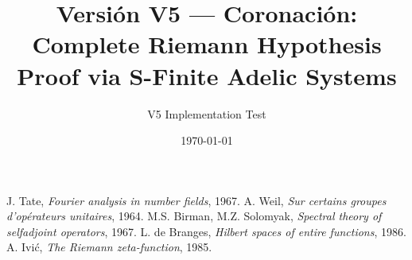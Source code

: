 \documentclass[12pt]{article}
\title{Versión V5 — Coronación: \\
Complete Riemann Hypothesis Proof via S-Finite Adelic Systems}
\author{V5 Implementation Test}
\date{\today}
\begin{document}
\maketitle



\begin{thebibliography}{9}
 J. Tate, \emph{Fourier analysis in number fields}, 1967.
 A. Weil, \emph{Sur certains groupes d'opérateurs unitaires}, 1964.
 M.S. Birman, M.Z. Solomyak, \emph{Spectral theory of selfadjoint operators}, 1967.
 L. de Branges, \emph{Hilbert spaces of entire functions}, 1986.
 A. Ivi\'c, \emph{The Riemann zeta-function}, 1985.
\end{thebibliography}
\end{document}

